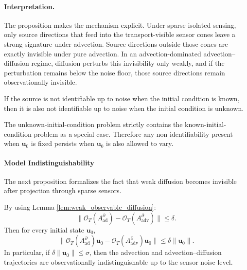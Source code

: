 \paragraph{Interpretation.}
The proposition makes the mechanism explicit. Under sparse isolated sensing, only source directions that feed into the transport-visible sensor cones leave a strong signature under advection. Source directions outside those cones are exactly invisible under pure advection. In an advection-dominated advection--diffusion regime, diffusion perturbs this invisibility only weakly, and if the perturbation remains below the noise floor, those source directions remain observationally invisible.

\begin{corollary}
\label{cor:source_nonid_unknown_ic}
If the source is not identifiable up to noise when the initial condition is known, then it is also not identifiable up to noise when the initial condition is unknown.
\end{corollary}

The unknown-initial-condition problem strictly contains the known-initial-condition problem as a special case. Therefore any non-identifiability present when $\mathbf{u}_0$ is fixed persists when $\mathbf{u}_0$ is also allowed to vary.

\paragraph{Model Indistinguishability}

The next proposition formalizes the fact that weak diffusion becomes invisible after projection through sparse sensors.

\begin{proposition}
\label{prop:adv_ad_indist}
By using Lemma \ref{lem:weak_observable_diffusion}:
\begin{equation}
\|\mathcal{O}_T(A_{\mathrm{ad}}^{\partial}) - \mathcal{O}_T(A_{\mathrm{adv}}^{\partial})\| \le \delta.
\end{equation}
Then for every initial state $\mathbf{u}_0$,
\begin{equation}
\|\mathcal{O}_T(A_{\mathrm{ad}}^{\partial})\mathbf{u}_0
-
\mathcal{O}_T(A_{\mathrm{adv}}^{\partial})\mathbf{u}_0\|
\le
\delta \|\mathbf{u}_0\|.
\label{eq:adv_ad_bound}
\end{equation}
In particular, if $\delta \|\mathbf{u}_0\| \le \sigma$, then the advection and advection--diffusion trajectories are observationally indistinguishable up to the sensor noise level.
\end{proposition}



